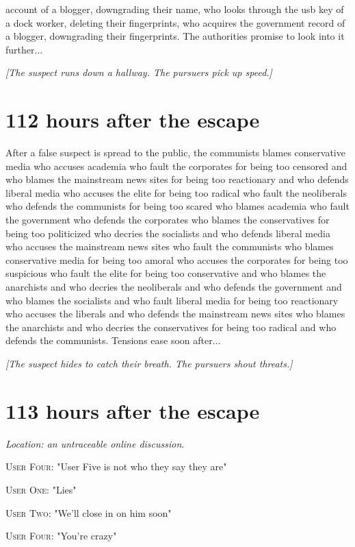 \documentclass{report}
\begin{document}
account of a blogger, downgrading their name, who looks through the usb key of a dock worker, deleting their fingerprints, who acquires the government record of a blogger, downgrading their fingerprints. The authorities promise to look into it further...

\textit{[The suspect runs down a hallway. The pursuers pick up speed.]}


\section*{112 \small{hours after the escape}}

After a false suspect is spread to the public, the communists blames conservative media who accuses academia who fault the corporates for being too censored and who blames the mainstream news sites for being too reactionary and who defends liberal media who accuses the elite for being too radical who fault the neoliberals who defends the communists for being too scared who blames academia who fault the government who defends the corporates who blames the conservatives for being too politicized who decries the socialists and who defends liberal media who accuses the mainstream news sites who fault the communists who blames conservative media for being too amoral who accuses the corporates for being too suspicious who fault the elite for being too conservative and who blames the anarchists and who decries the neoliberals and who defends the government and who blames the socialists and who fault liberal media for being too reactionary who accuses the liberals and who defends the mainstream news sites who blames the anarchists and who decries the conservatives for being too radical and who defends the communists. Tensions ease soon after...

\textit{[The suspect hides to catch their breath. The pursuers shout threats.]}


\section*{113 \small{hours after the escape}}

\textit{Location: an untraceable online discussion}. 

\textsc{User Four}: "User Five is not who they say they are" 

\textsc{User One}: "Lies" 

\textsc{User Two}: "We'll close in on him soon" 

\textsc{User Four}: "You're crazy" 
\end{document}
